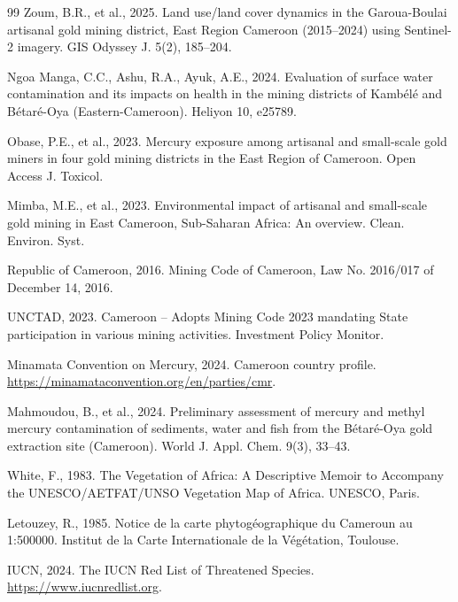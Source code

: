 \documentclass[preprint,12pt,authoryear]{elsarticle}
\begin{document}
\begin{thebibliography}{99}
Zoum, B.R., et al., 2025. Land use/land cover dynamics in the Garoua-Boulai artisanal gold mining district, East Region Cameroon (2015--2024) using Sentinel-2 imagery. GIS Odyssey J. 5(2), 185--204.

Ngoa Manga, C.C., Ashu, R.A., Ayuk, A.E., 2024. Evaluation of surface water contamination and its impacts on health in the mining districts of Kamb\'{e}l\'{e} and B\'{e}tar\'{e}-Oya (Eastern-Cameroon). Heliyon 10, e25789.

Obase, P.E., et al., 2023. Mercury exposure among artisanal and small-scale gold miners in four gold mining districts in the East Region of Cameroon. Open Access J. Toxicol.

Mimba, M.E., et al., 2023. Environmental impact of artisanal and small-scale gold mining in East Cameroon, Sub-Saharan Africa: An overview. Clean. Environ. Syst.

Republic of Cameroon, 2016. Mining Code of Cameroon, Law No. 2016/017 of December 14, 2016.

UNCTAD, 2023. Cameroon -- Adopts Mining Code 2023 mandating State participation in various mining activities. Investment Policy Monitor.

Minamata Convention on Mercury, 2024. Cameroon country profile. \url{https://minamataconvention.org/en/parties/cmr}.

Mahmoudou, B., et al., 2024. Preliminary assessment of mercury and methyl mercury contamination of sediments, water and fish from the B\'{e}tar\'{e}-Oya gold extraction site (Cameroon). World J. Appl. Chem. 9(3), 33--43.

White, F., 1983. The Vegetation of Africa: A Descriptive Memoir to Accompany the UNESCO/AETFAT/UNSO Vegetation Map of Africa. UNESCO, Paris.

Letouzey, R., 1985. Notice de la carte phytog\'{e}ographique du Cameroun au 1:500000. Institut de la Carte Internationale de la V\'{e}g\'{e}tation, Toulouse.

IUCN, 2024. The IUCN Red List of Threatened Species. \url{https://www.iucnredlist.org}.


\end{thebibliography}
\end{document}
